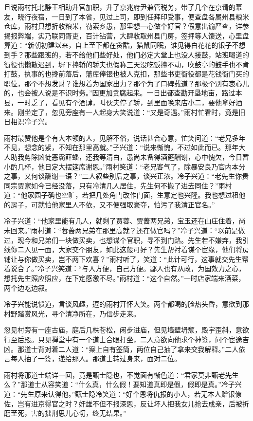 \documentclass[12pt,oneside]{book}
\begin{document}
且说雨村托北静王相助升官加职，升了京兆府尹兼管税务，带了几个在京请的幕友，晓行夜宿，一日到了本省，见过上司，即到任拜印受事，便查盘各属州县粮米仓库，雨村只想折收粮米，勒索乡愚，那里想一心做个好官？假意出谕严查，详参揭报弊端，实乃联同胥吏，百计钻营，大肆收取州县门房，签押等人馈送，心里盘算道：“新朝初建以来，自上至下都在贪酷，猫鼠同眠，谁见得白花花的银子不想到手？那些跟班的，若不给他们些好处，他们必定大堂上也没人接鼓，站班喝道的衙役也懒散迟到，墀下擡轿的轿夫也假称三天没吃饭擡不动，吹鼓亭的鼓手也不肯打鼓，执事的也搀前落后，藩库俸银也被人克扣，那些书吏衙役都是花钱衙门买的职位，那个不想发财？谁想着为国家出力？那个为了口碑载道？那极个别有衷心儿的，也会被人说是不识时务。”因更加贪腐起来。一日出都查勘开垦地亩，路过本县，一时乏了，看见有个酒肆，叫伙夫停了轿，到里面唤来店小二，要他拿好酒来。刚坐定了，忽见旁座有一人起身大笑说道：“又是奇遇。”雨村忙看时，竟是旧日相识冷子兴。

雨村最赞他是个有大本领的人，见解不俗，说话甚合心意，忙笑问道：“老兄多年不见，想念的紧，不知在那里高就。”子兴道：“说来惭愧，不过如此而已。那年大人助我剪除凶徒恶霸薛蟠，还我等清白，愚尚未备得酒筵酬谢，心中愧欠，今日暂小酌几杯，他日定大摆筵席谢恩。”雨村笑道：“老兄客气了，除暴安良乃官内本分之事，又何谈酬谢一语？”二人叙些别后之事，谈兴正浓。冷子兴道：“老先生你贵同宗贾家如今已经没落，只有冷清几人居住，先生何不搬了进去同住？”雨村道：“他家园子确也空旷，若把几处角门改作门面，生意定也兴隆。我也想过租他的房子，可就怕他家里人不依，又不便强取豪夺，怕污了我清正官名。”

冷子兴道：“他家里能有几人，就剩了贾蓉、贾蔷两兄弟，宝玉还在山庄住着，尚未回来。”雨村道：“蓉蔷两兄弟在那里高就？还在做官吗？”冷子兴道：“以前是做过，现今和兄弟们一块做买卖，也想谋个官职，寻不到门路。先生若不嫌弃，我引线你二人见一面，大家交个朋友，如此这般可好？先生帮衬着谋个宦缘，他们将房铺让与你做买卖，岂不两下欢喜？”雨村听了，笑道：“此计可行，这事就交先生帮着说合了。”冷子兴笑道：“与人方便，自己方便。鄙人也有从政，为国效力之心，想托先生照应照应，在下定感激不尽。”雨村道：“这个自然。”一时店家端来酒菜，两个边吃边叙。

冷子兴能说惯道，言谈风趣，逗的雨村开怀大笑。两个都喝的脸热头昏，意欲到那村野踏赏风光，寻个清净所在，乃信步走来。

忽见村旁有一座古庙，庭后几株苍松，闲步进庙，但见墙壁坍颓，殿宇歪斜，意欲行至后殿。只见禅堂中有一个道士合眼打坐，二人意欲向他求个神签，问个宦途吉凶。那道士背对着二人道：“案上自有签筒，两位自己抽了拿来交我解释。”二人依言每人抽了一签，递给那人。那道士转过身来，面对二位。

雨村将那道士端详一回，竟是甄士隐也，不觉面有惭色道：“君家莫非甄老先生么？”那道士从容笑道：“什么真，什么假！要知道真即是假，假即是真。”冷子兴道：“先生原来认得他。”甄士隐冷笑道：“好个恩将仇报的小人，若无本人赠银僚佐，岂有进京得官之时？奸雄不但不报深恩，反让坏人把我女儿抢去成亲，后被折磨至死，害的拙荆思儿心切，终无结果。”
\end{document}
